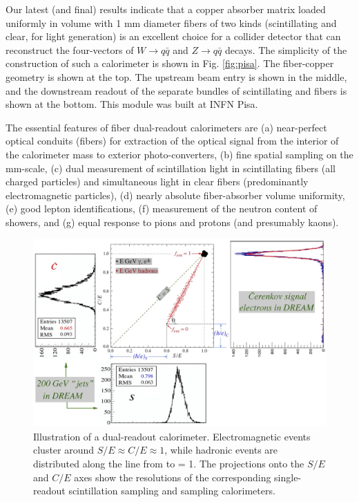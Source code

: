 Our latest (and final) results indicate that a copper absorber matrix loaded uniformly in volume with 1 mm diameter
fibers of two kinds (scintillating and clear, for \C light generation) is an excellent choice for a collider detector that 
can reconstruct the four-vectors of $W \rightarrow q\bar{q}$ and  $Z \rightarrow q\bar{q}$ decays.  The simplicity of the construction of such a calorimeter is shown in Fig. \ref{fig:pisa}.  The fiber-copper geometry is shown at the top.  The upstream beam entry is shown in the middle, and the downstream readout of the separate bundles of  scintillating and \C fibers is shown at the bottom.  This module was built at INFN Pisa.

The essential features of  fiber dual-readout calorimeters are (a) near-perfect optical conduits (fib\-ers)
for extraction of the optical signal from the interior of the calorimeter mass to exterior photo-convert\-ers, 
(b) fine spatial sampling on the mm-scale, (c) dual measurement of scintillation light in scintillating
fibers (all charged particles) and simultaneous \C light in clear fibers (predominantly electromagnetic
particles), (d) nearly absolute fiber-absorber volume uniformity, (e) good lepton identifications, (f) measurement of the neutron content of showers, and (g) equal response to pions and protons (and presumably kaons).
 
 
\begin{figure}
 \centering
 \includegraphics[scale=0.18]{groom-plot-projs.jpg}
  \caption{Illustration of a dual-readout calorimeter.  Electromagnetic events cluster around $S/E\approx C/E \approx 1$,
  while hadronic events are distributed along the line from  to \fem = 1.  The projections onto the $S/E$ and $C/E$
  axes show the resolutions of the corresponding single-readout scintillation sampling and \C sampling calorimeters.}  
  \label{fig:groom}
\end{figure}

